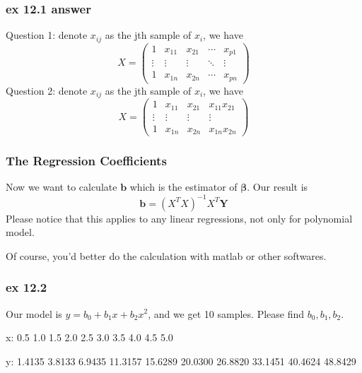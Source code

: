 \documentclass{beamer}
\begin{document}
\begin{frame}
    \frametitle{ex 12.1 answer}
    Question 1: denote $x_{ij}$ as the jth sample of $x_i$, we have
    \begin{equation*}
        X=
        \left(
        \begin{array}{ccccc}
            1 & x_{11} & x_{21} & \cdots & x_{p1}\\
            \vdots & \vdots & \vdots & \ddots & \vdots\\
            1 & x_{1n} & x_{2n} & \cdots & x_{pn}
        \end{array}
        \right)
    \end{equation*}
    Question 2: denote $x_{ij}$ as the jth sample of $x_i$, we have
    \begin{equation*}
        X=
        \left(
        \begin{array}{ccccc}
            1 & x_{11} & x_{21}  & x_{11}x_{21}\\
            \vdots & \vdots & \vdots  & \vdots\\
            1 & x_{1n} & x_{2n}  & x_{1n}x_{2n}
        \end{array}
        \right)
    \end{equation*}

\end{frame}

\begin{frame}
    \frametitle{The Regression Coefficients}

    Now we want to calculate $\mathbf{b}$ which is the estimator of $\boldsymbol{\beta}$. Our result is
    \[\mathbf{b}=(X^{T}X)^{-1}X^{T}\mathbf{Y}\]
    Please notice that this applies to any linear regressions, not only for polynomial model.\par
    Of course, you'd better do the calculation with matlab or other softwares.

\end{frame}



\begin{frame}
    \frametitle{ex 12.2}

    Our model is $y=b_0+b_1 x+b_2 x^2$, and we get 10 samples. Please find $b_0, b_1, b_2$.\par
    x: 0.5    1.0    1.5    2.0    2.5    3.0    3.5    4.0    4.5    5.0\par
    y: 1.4135    3.8133    6.9435   11.3157   15.6289   20.0300   26.8820   33.1451   40.4624   48.8429

\end{frame}
\end{document}
